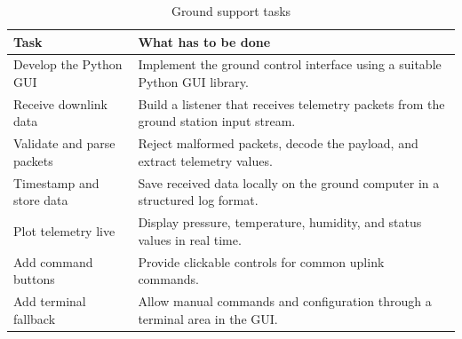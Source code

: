 \begin{table}[H]
\centering
\caption{Ground support tasks}
\label{tab:ground_support_tasks}
\begin{tabular}{p{4cm}p{9cm}}
\toprule
\textbf{Task} & \textbf{What has to be done} \\
\midrule
Develop the Python GUI & Implement the ground control interface using a suitable Python GUI library. \\
Receive downlink data & Build a listener that receives telemetry packets from the ground station input stream. \\
Validate and parse packets & Reject malformed packets, decode the payload, and extract telemetry values. \\
Timestamp and store data & Save received data locally on the ground computer in a structured log format. \\
Plot telemetry live & Display pressure, temperature, humidity, and status values in real time. \\
Add command buttons & Provide clickable controls for common uplink commands. \\
Add terminal fallback & Allow manual commands and configuration through a terminal area in the GUI. \\
\bottomrule
\end{tabular}
\end{table}


